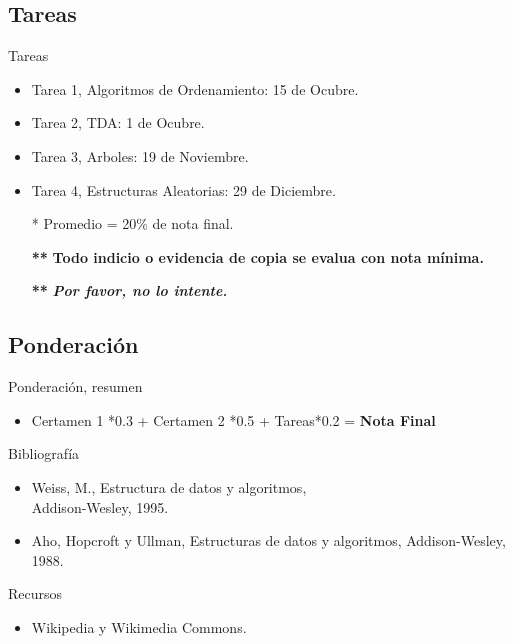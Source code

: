 \documentclass{beamer} %
\begin{document}
\subsection{Tareas}
\begin{frame}
  \begin{block}{Tareas}
  \begin{itemize}
    \item Tarea 1, Algoritmos de Ordenamiento: 15 de Ocubre.
    \item Tarea 2, TDA: 1 de Ocubre.
    \item Tarea 3, Arboles: 19 de Noviembre.
    \item Tarea 4, Estructuras Aleatorias: 29 de Diciembre.
    \item[*] Promedio = 20\% de nota final.
    \item[\textbf{**}] \textbf{Todo indicio o evidencia de copia se evalua con nota mínima.}
    \item[\textbf{**}] \textit{\textbf{Por favor, no lo intente.}}
  \end{itemize}

\end{block}
\end{frame}

\subsection{Ponderación}
\begin{frame}
  \begin{block}{Ponderación, resumen}

  \begin{itemize}
    \item Certamen 1 *0.3 + Certamen 2 *0.5 + Tareas*0.2 = \textbf{Nota Final}
  \end{itemize}
\end{block}
\end{frame}


\begin{frame}
 \begin{block}{Bibliografía}
  \begin{itemize}
    \item Weiss, M., Estructura de datos y algoritmos,\\ Addison-Wesley, 1995.
    \item Aho, Hopcroft y Ullman, Estructuras de datos y algoritmos, Addison-Wesley, 1988.
  \end{itemize}
 \end{block}
 \begin{block}{Recursos}
  \begin{itemize}
    \item Wikipedia y Wikimedia Commons.
  \end{itemize}
 \end{block}
\end{frame}
\end{document}
